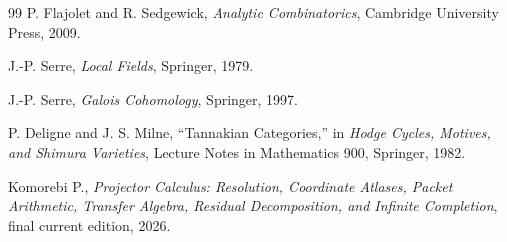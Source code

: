 \documentclass[11pt]{article}
\theoremstyle{definition}
\theoremstyle{remark}
\begin{document}
\begin{thebibliography}{99}
P. Flajolet and R. Sedgewick, \emph{Analytic Combinatorics}, Cambridge University Press, 2009.

J.-P. Serre, \emph{Local Fields}, Springer, 1979.

J.-P. Serre, \emph{Galois Cohomology}, Springer, 1997.

P. Deligne and J. S. Milne, ``Tannakian Categories,'' in \emph{Hodge Cycles, Motives, and Shimura Varieties}, Lecture Notes in Mathematics 900, Springer, 1982.

Komorebi P., \emph{Projector Calculus: Resolution, Coordinate Atlases, Packet Arithmetic, Transfer Algebra, Residual Decomposition, and Infinite Completion}, final current edition, 2026.

\end{thebibliography}
\end{document}
